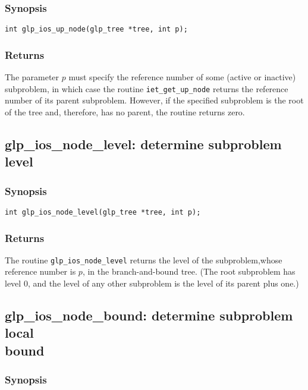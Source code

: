 \subsubsection*{Synopsis}

\begin{verbatim}
int glp_ios_up_node(glp_tree *tree, int p);
\end{verbatim}

\subsubsection*{Returns}

The parameter $p$ must specify the reference number of some (active or
inactive) subproblem, in which case the routine \verb|iet_get_up_node|
returns the reference number of its parent subproblem. However, if the
specified subproblem is the root of the tree and, therefore, has
no parent, the routine returns zero.

\subsection{glp\_ios\_node\_level: determine subproblem level}

\subsubsection*{Synopsis}

\begin{verbatim}
int glp_ios_node_level(glp_tree *tree, int p);
\end{verbatim}

\subsubsection*{Returns}

The routine \verb|glp_ios_node_level| returns the level of the
subproblem,\linebreak whose reference number is $p$, in the
branch-and-bound tree. (The root subproblem has level 0, and the level
of any other subproblem is the level of its parent plus one.)

\subsection{glp\_ios\_node\_bound: determine subproblem local\\bound}

\subsubsection*{Synopsis}

